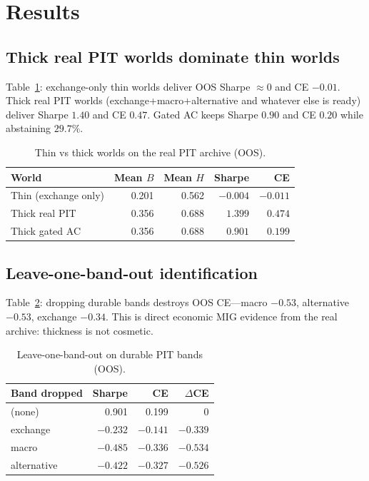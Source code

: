 \documentclass[12pt]{article}
\begin{document}
\section{Results}

\subsection{Thick real PIT worlds dominate thin worlds}
Table~\ref{tab:thin}: exchange-only thin worlds deliver OOS Sharpe $\approx 0$ and CE $-0.01$. Thick real PIT worlds (exchange+macro+alternative and whatever else is ready) deliver Sharpe $1.40$ and CE $0.47$. Gated AC keeps Sharpe $0.90$ and CE $0.20$ while abstaining $29.7\%$.

\begin{table}[t]
\centering
\caption{Thin vs thick worlds on the real PIT archive (OOS).}
\label{tab:thin}
\begin{tabular}{lrrrr}
\toprule
World & Mean $B$ & Mean $H$ & Sharpe & CE \\
\midrule
Thin (exchange only) & 0.201 & 0.562 & $-0.004$ & $-0.011$ \\
Thick real PIT & 0.356 & 0.688 & $1.399$ & $0.474$ \\
Thick gated AC & 0.356 & 0.688 & $0.901$ & $0.199$ \\
\bottomrule
\end{tabular}
\end{table}

\subsection{Leave-one-band-out identification}
Table~\ref{tab:lobo}: dropping durable bands destroys OOS CE---macro $-0.53$, alternative $-0.53$, exchange $-0.34$. This is direct economic MIG evidence from the real archive: thickness is not cosmetic.

\begin{table}[t]
\centering
\caption{Leave-one-band-out on durable PIT bands (OOS).}
\label{tab:lobo}
\begin{tabular}{lrrr}
\toprule
Band dropped & Sharpe & CE & $\Delta$CE \\
\midrule
(none) & 0.901 & 0.199 & 0 \\
exchange & $-0.232$ & $-0.141$ & $-0.339$ \\
macro & $-0.485$ & $-0.336$ & $-0.534$ \\
alternative & $-0.422$ & $-0.327$ & $-0.526$ \\
\bottomrule
\end{tabular}
\end{table}
\end{document}
